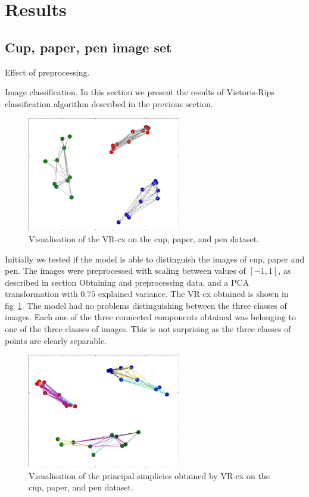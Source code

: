\documentclass{article}
\newcommand{\enterProblemHeader}[1]{
}
\newcommand{\exitProblemHeader}[1]{
}
\newcounter{homeworkProblemCounter} %
\newcommand{\homeworkProblemName}{}
\newenvironment{homeworkProblem}[1][Problem \arabic{homeworkProblemCounter}]{ %
\stepcounter{homeworkProblemCounter} %
\renewcommand{\homeworkProblemName}{#1} %
\section{\homeworkProblemName} %
\enterProblemHeader{\homeworkProblemName} %
}{
\exitProblemHeader{\homeworkProblemName} %
}
\newcommand{\homeworkSectionName}{}
\newenvironment{homeworkSection}[1]{ %
\renewcommand{\homeworkSectionName}{#1} %
\subsection{\homeworkSectionName} %
\enterProblemHeader{\homeworkProblemName\ [\homeworkSectionName]} %
}{
\enterProblemHeader{\homeworkProblemName} %
}
\begin{document}
\begin{homeworkProblem}[Results]
\begin{homeworkSection}{Cup, paper, pen image set}
\begin{paragraph}{Effect of preprocessing.}
\end{paragraph}

\begin{paragraph}{Image classification.}  In this section we present the results of Vietoris-Rips classification algorithm described in the previous section.

\begin{figure}[h]
    \centering
    \includegraphics[height=5cm]{img/vr_cx}
    \caption{Visualisation of the VR-cx on the cup, paper, and pen dataset.}
    \label{fig:vr_cx}
\end{figure}


Initially we tested if the model is able to distinguish the images of cup, paper and pen. The images were preprocessed with scaling between values of $[-1, 1]$, as described in section Obtaining and preprocessing data, and a PCA transformation with $0.75$ explained variance. The VR-cx obtained is shown in fig~\ref{fig:vr_cx}. The model had no problems distinguishing between the three classes of images. Each one of the three connected components obtained was belonging to one of the three classes of images. This is not surprising as the three classes of points are clearly separable.
\end{paragraph}

\begin{figure}[h]
    \centering
    \includegraphics[height=5cm]{img/vr_princ}
    \caption{Visualisation of the principal simplicies obtained by VR-cx on the cup, paper, and pen dataset.}
    \label{fig:vr_princ}
\end{figure}


\end{homeworkSection}
\end{homeworkProblem}
\end{document}
